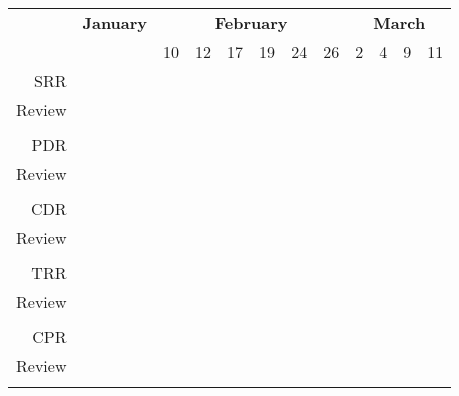 \begin{tabular}{rlllllllllll}
\multicolumn{1}{c}{\textbf{}} &
\multicolumn{1}{c}{\cellcolor[HTML]{9AFF99}\textbf{January}} &
\multicolumn{6}{c}{\cellcolor[HTML]{FFCC67}\textbf{February}} &
\multicolumn{4}{c}{\cellcolor[HTML]{96FFFB}\textbf{March}} \\
& & 10 & 12 & 17 & 19 & 24 & 26 & 2 & 4 & 9 & 11 \\ \hline

SRR    & & \cellcolor[HTML]{FD6864} & & & & & & & & & \\
Review & & & \cellcolor[HTML]{9698ED} & & & & & & & & \\ \\
PDR    & & & & \cellcolor[HTML]{FD6864} & & & & & & & \\
Review & & & & & \cellcolor[HTML]{9698ED} & & & & & & \\ \\
CDR    & & & & & & \cellcolor[HTML]{FD6864} & & & & & \\
Review & & & & & & & \cellcolor[HTML]{9698ED} & & & & \\ \\
TRR    & & & & & & & & \cellcolor[HTML]{FD6864} & & & \\
Review & & & & & & & & & \cellcolor[HTML]{9698ED} & & \\ \\
CPR    & & & & & & & & & & \cellcolor[HTML]{FD6864} & \\
Review & & & & & & & & & & & \cellcolor[HTML]{9698ED}\\ \\


\end{tabular}
